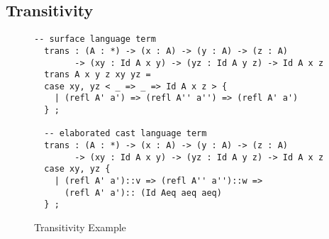  
 
 
 

\subsection{Transitivity}

\begin{figure}
  \begin{lstlisting}[basicstyle=\ttfamily\small]
  -- surface language term
  trans : (A : *) -> (x : A) -> (y : A) -> (z : A)
        -> (xy : Id A x y) -> (yz : Id A y z) -> Id A x z
  trans A x y z xy yz =
  case xy, yz < _ => _ => Id A x z > {
    | (refl A' a') => (refl A'' a'') => (refl A' a')
  } ;
  
  -- elaborated cast language term
  trans : (A : *) -> (x : A) -> (y : A) -> (z : A)
        -> (xy : Id A x y) -> (yz : Id A y z) -> Id A x z
  case xy, yz {
    | (refl A' a')::v => (refl A'' a'')::w => 
      (refl A' a'):: (Id Aeq aeq aeq)
  } ;
\end{lstlisting}

\caption{Transitivity Example}
\label{fig:cast-trans}
\end{figure}


